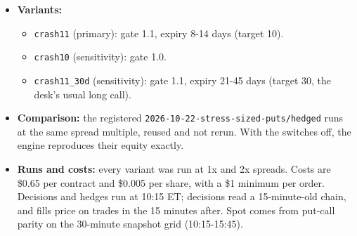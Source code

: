 \documentclass{article}
\begin{document}
\begin{itemize}
\begin{itemize}

\item At the 10:15 decision, if VIX/\allowbreak{}VIX3M at the prior close is at or above the gate and no crash call is open, the book buys at-the-money calls with 0.5\% of capital (\$1,250).

\item The call is held 5 trading days, with no stop, profit-take or flat exit; if the gate is still on when it closes, a new one is bought at the same step.

\item It sits beside the put (it does not use the put's slot) and is not counted in the put's stress test. Its delta joins the book's daily 10-share hedge.

\end{itemize}

\item \textbf{Variants:}

\begin{itemize}

\item \texttt{crash11} (primary): gate 1.1, expiry 8-14 days (target 10).

\item \texttt{crash10} (sensitivity): gate 1.0.

\item \texttt{crash11\_\allowbreak{}30d} (sensitivity): gate 1.1, expiry 21-45 days (target 30, the desk's usual long call).

\end{itemize}

\item \textbf{Comparison:} the registered \texttt{2026-\allowbreak{}10-\allowbreak{}22-\allowbreak{}stress-\allowbreak{}sized-\allowbreak{}puts/\allowbreak{}hedged} runs at the same spread multiple, reused and not rerun. With the switches off, the engine reproduces their equity exactly.

\item \textbf{Runs and costs:} every variant was run at 1x and 2x spreads. Costs are \$0.65 per contract and \$0.005 per share, with a \$1 minimum per order. Decisions and hedges run at 10:15 ET; decisions read a 15-minute-old chain, and fills price on trades in the 15 minutes after. Spot comes from put-call parity on the 30-minute snapshot grid (10:15-15:45).

\end{itemize}
\end{document}
